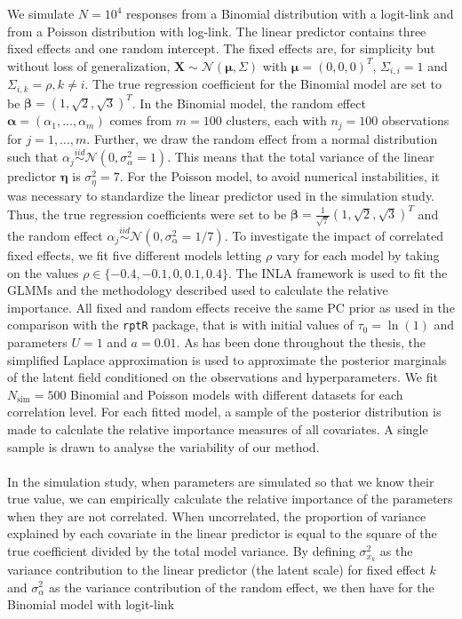 We simulate $N=10^4$ responses from a Binomial distribution with a logit-link and from a Poisson distribution with log-link. The linear predictor contains three fixed effects and one random intercept. The fixed effects are, for simplicity but without loss of generalization, $\mathbf{X} \sim \mathcal{N}(\boldsymbol{\mu}, \Sigma)$ with $\boldsymbol{\mu} = (0, 0, 0)^T$, $\Sigma_{i, i} = 1$ and $\Sigma_{i, k} = \rho, k \neq i$. The true regression coefficient for the Binomial model are set to be $\boldsymbol{\beta}=(1, \sqrt{2}, \sqrt{3})^T$. In the Binomial model, the random effect $\boldsymbol{\alpha}=(\alpha_1, ..., \alpha_m)$ comes from $m=100$ clusters, each with $n_j=100$ observations for $j=1, ..., m$. Further, we draw the random effect from a normal distribution such that $\alpha_j \stackrel{iid}{\sim} \mathcal{N}(0, \sigma^2_{\alpha}=1)$. This means that the total variance of the linear predictor $\boldsymbol{\eta}$ is $\sigma_{\eta}^2=7$. For the Poisson model, to avoid numerical instabilities, it was necessary to standardize the linear predictor used in the simulation study. Thus, the true regression coefficients were set to be $\boldsymbol{\beta}=\frac{1}{\sqrt{7}}(1, \sqrt{2}, \sqrt{3})^T$ and the random effect $\alpha_j \stackrel{iid}{\sim} \mathcal{N}(0, \sigma^2_{\alpha}=1/7)$. To investigate the impact of correlated fixed effects, we fit five different models letting $\rho$ vary for each model by taking on the values $\rho \in \{-0.4, -0.1, 0, 0.1, 0.4\}$. The INLA framework is used to fit the GLMMs and the methodology described used to calculate the relative importance. All fixed and random effects receive the same PC prior as used in the comparison with the \texttt{rptR} package, that is with initial values of $\tau_0=\ln(1)$ and parameters $U=1$ and $a=0.01$. As has been done throughout the thesis, the simplified Laplace approximation is used to approximate the posterior marginals of the latent field conditioned on the observations and hyperparameters. We fit $N_{\text{sim}}=500$ Binomial and Poisson models with different datasets for each correlation level. For each fitted model, a sample of the posterior distribution is made to calculate the relative importance measures of all covariates. A single sample is drawn to analyse the variability of our method. 
\\
\\
In the simulation study, when parameters are simulated so that we know their true value, we can empirically calculate the relative importance of the parameters when they are not correlated. When uncorrelated, the proportion of variance explained by each covariate in the linear predictor is equal to the square of the true coefficient divided by the total model variance. By defining $\sigma_{x_k}^2$ as the variance contribution to the linear predictor (the latent scale) for fixed effect $k$ and $\sigma^2_{\alpha}$ as the variance contribution of the random effect, we then have for the Binomial model with logit-link
